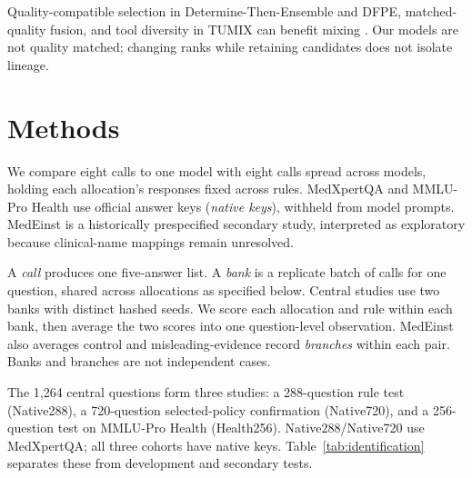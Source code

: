 \documentclass{article}
\begin{document}
Quality-compatible selection in Determine-Then-Ensemble and DFPE, matched-quality fusion, and tool diversity in TUMIX can benefit mixing \citep{yao2025determine,cohen2026dfpe,chen2026cofailure,chen2026tumix}. Our models are not quality matched; changing ranks while retaining candidates does not isolate lineage.

\section{Methods}

We compare eight calls to one model with eight calls spread across models, holding each allocation's responses fixed across rules. MedXpertQA \citep{zuo2025medxpertqa} and MMLU-Pro Health use official answer keys (\emph{native keys}), withheld from model prompts. MedEinst is a historically prespecified secondary study, interpreted as exploratory because clinical-name mappings remain unresolved.

A \emph{call} produces one five-answer list. A \emph{bank} is a replicate batch of calls for one question, shared across allocations as specified below. Central studies use two banks with distinct hashed seeds. We score each allocation and rule within each bank, then average the two scores into one question-level observation. MedEinst also averages control and misleading-evidence record \emph{branches} within each pair. Banks and branches are not independent cases.

The 1,264 central questions form three studies: a 288-question rule test (Native288), a 720-question selected-policy confirmation (Native720), and a 256-question test on MMLU-Pro Health (Health256). Native288/Native720 use MedXpertQA; all three cohorts have native keys. Table~\ref{tab:identification} separates these from development and secondary tests.
\end{document}

